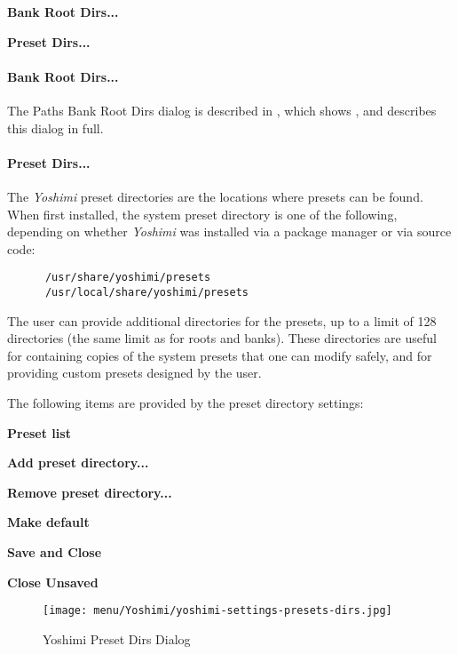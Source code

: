    \begin{enumber}
      \item \textbf{Bank Root Dirs...}
      \item \textbf{Preset Dirs...}
   \end{enumber}

   \paragraph{Bank Root Dirs...}
   The Paths Bank Root Dirs dialog is described in
   ,
   which shows
   , and describes this dialog in full.

   \paragraph{Preset Dirs...}
   The \textsl{Yoshimi} preset directories are the locations where
   presets can be found.  When first installed, the system
   preset directory is one of the following, depending on whether
   \textsl{Yoshimi} was installed via a package manager or via source code:

   \begin{verbatim}
      /usr/share/yoshimi/presets
      /usr/local/share/yoshimi/presets
   \end{verbatim}
   
   The user can provide additional directories for the presets, up to a limit
   of 128 directories (the same limit as for roots and banks).
   These directories are useful for containing copies of the system
   presets that one can modify safely, and for providing custom
   presets designed by the user.

   The following items are provided by the preset directory settings:

   \begin{enumber}
      \item \textbf{Preset list}
      \item \textbf{Add preset directory...}
      \item \textbf{Remove preset directory...}
      \item \textbf{Make default}
      \item \textbf{Save and Close}
      \item \textbf{Close Unsaved}
   \end{enumber}

\begin{figure}[H]
   \centering 
   \texttt{[image: menu/Yoshimi/yoshimi-settings-presets-dirs.jpg]}
   \caption[Preset Dirs Tab]{Yoshimi Preset Dirs Dialog}
   \label{fig:yoshimi_presets_dirs_tab}
\end{figure}

